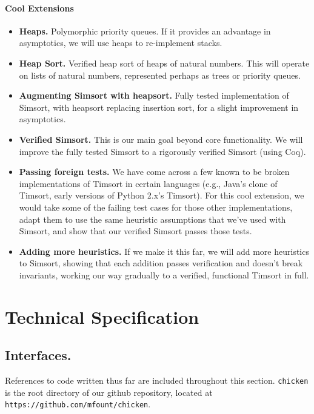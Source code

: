 \documentclass{article}
\begin{document}
\paragraph{Cool Extensions}
\begin{itemize}
  \item \textbf{Heaps.}
    Polymorphic priority queues.
    If it provides an advantage in asymptotics,
    we will use heaps to re-implement stacks.
  \item \textbf{Heap Sort.}
    Verified heap sort of heaps of natural numbers.
    This will operate on lists of natural numbers, represented perhaps
    as trees or priority queues.
  \item \textbf{Augmenting Simsort with heapsort.}
    Fully tested implementation of Simsort, with heapsort replacing
    insertion sort, for a slight improvement in asymptotics.
  \item \textbf{Verified Simsort.}
    This is our main goal beyond core functionality.
    We will improve the fully tested Simsort to
    a rigorously verified Simsort (using Coq).
  \item \textbf{Passing foreign tests.}
    We have come across a few known to be broken implementations of Timsort
    in certain languages (e.g., Java's clone of Timsort,
    early versions of Python 2.x's Timsort).
    For this cool extension, we would take some of the failing test cases for
    those other implementations, adapt them to use the same heuristic
    assumptions that we've used with Simsort, and show that our verified
    Simsort passes those tests.
  \item \textbf{Adding more heuristics.}
    If we make it this far, we will add more heuristics to Simsort,
    showing that each addition passes verification and doesn't break
    invariants, working our way gradually to a verified, functional
    Timsort in full.
\end{itemize}


\section{Technical Specification}
\subsection{Interfaces.} References to code written thus far are included
throughout this section. \verb|chicken| is the root directory of our github
repository, located at \verb|https://github.com/mfount/chicken|.
\end{document}

